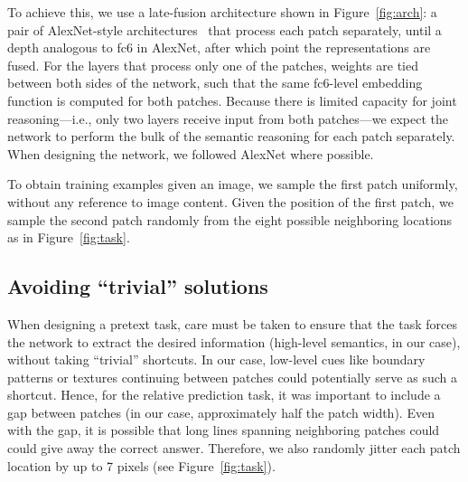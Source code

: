 \documentclass[10pt,twocolumn,letterpaper]{article}
\begin{document}
To achieve this, we use a late-fusion architecture shown in Figure~\ref{fig:arch}: a pair of AlexNet-style architectures~\cite{krizhevsky2012imagenet} that process each patch separately, until a depth analogous to fc6 in AlexNet, after which point the representations are fused.  For the layers that process only one of the patches, weights are tied between both sides of the network, such that the same fc6-level embedding function is computed for both patches.  
Because there is limited capacity for joint reasoning---i.e., only two layers receive input from both patches---we expect the network to perform the bulk of the semantic reasoning for each patch separately.
When designing the network, we followed AlexNet where possible.  

To obtain training examples given an image, we sample the first patch uniformly, without any reference to image content.
Given the position of the first patch, we sample the second patch randomly from the eight possible neighboring locations as in Figure~\ref{fig:task}.  

\vspace{-0.05in}
\subsection{Avoiding ``trivial'' solutions}
\vspace{-0.05in}

When designing a pretext task, care must be taken to ensure that the task forces the network to extract the desired information (high-level semantics, in our case), 
without taking ``trivial'' shortcuts. 
In our case, low-level cues like boundary patterns or textures continuing between patches could potentially serve as such a shortcut.  
Hence, for the relative prediction task, it was important to include a gap between patches (in our case, approximately half the patch width).  
Even with the gap, it is possible that long lines spanning neighboring patches could could give away the correct answer.
Therefore, we also randomly jitter each patch location by up to 7 pixels (see Figure~\ref{fig:task}).
\end{document}
